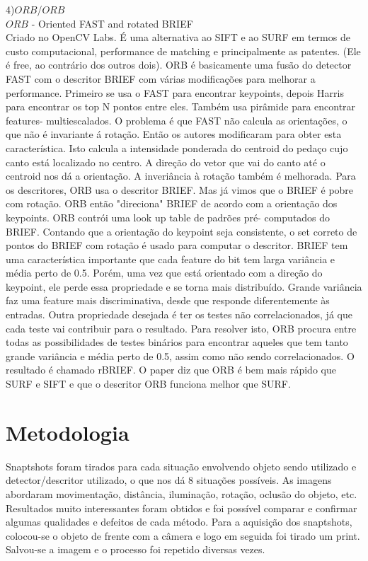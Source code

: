 \documentclass[conference]{IEEEtran}
\begin{document}
	  4)$ORB$/$ORB$					\\
	 $ORB$ - Oriented FAST and rotated BRIEF	\\
	 Criado no OpenCV Labs. \'E uma alternativa ao SIFT e ao SURF em termos de custo computacional, performance 
	 de matching e principalmente as patentes. (Ele \'e free, ao contr\'ario dos outros dois).
	 ORB \'e basicamente uma fus\~ao do detector FAST com o descritor BRIEF com v\'arias modifica\c{c}\~oes para melhorar 
	 a performance. 
	 Primeiro se usa o FAST para encontrar keypoints, depois Harris para encontrar os top N pontos entre eles. Tamb\'em 
	 usa pir\^amide para encontrar features- multiescalados. O problema \'e que FAST n\~ao calcula as orienta\c{c}\~oes, 
	 o que n\~ao \'e invariante \'a rota\c{c}\~ao. Ent\~ao os autores modificaram para obter esta caracter\'istica.
	 Isto calcula a intensidade ponderada do centroid do peda\c{c}o cujo canto est\'a localizado no centro. A dire\c{c}\~ao 
	 do vetor que vai do canto at\'e o centroid nos d\'a a orienta\c{c}\~ao. A inveri\^ancia \`a rota\c{c}\~ao tamb\'em 
	 \'e melhorada.
	 Para os descritores, ORB usa o descritor BRIEF. Mas j\'a vimos que o BRIEF \'e pobre com rota\c{c}\~ao. ORB ent\~ao 
	 "direciona" BRIEF de acordo com a orienta\c{c}\~ao dos keypoints. ORB contr\'oi uma look up table de padr\~oes pr\'e-
	 computados do BRIEF. Contando que a orienta\c{c}\~ao do keypoint seja consistente, o set correto de pontos do BRIEF 
	 com rota\c{c}\~ao \'e usado para computar o descritor.
	 BRIEF tem uma caracter\'istica importante que cada feature do bit tem larga vari\^ancia e m\'edia perto de 0.5. Por\'em, 
	 uma vez que est\'a orientado com a dire\c{c}\~ao do keypoint, ele perde essa propriedade e se torna mais distribu\'ido. 
	 Grande vari\^ancia faz uma feature mais discriminativa, desde que responde diferentemente \`as entradas. Outra
	 propriedade desejada \'e ter os testes n\~ao correlacionados, j\'a que cada teste vai contribuir para o resultado.
	 Para resolver isto, ORB procura entre todas as possibilidades de testes bin\'arios para encontrar aqueles que tem 
	 tanto grande vari\^ancia e m\'edia perto de 0.5, assim como n\~ao sendo correlacionados. O resultado \'e chamado 
	 rBRIEF.
	 O paper diz que ORB \'e bem mais r\'apido que SURF e SIFT e que o descritor ORB funciona melhor que SURF.
	 
\section{Metodologia} 
\label{sec:meth} 
  \nobreak\hspace{.16667em plus .08333em} 
  Snaptshots foram tirados para cada situa\c{c}\~ao envolvendo objeto sendo utilizado e detector/descritor
  utilizado, o que nos d\'a 8 situa\c{c}\~oes poss\'iveis. As imagens abordaram movimenta\c{c}\~ao, dist\^ancia, ilumina\c{c}\~ao,  
  rota\c{c}\~ao, oclus\~ao do objeto, etc. Resultados muito interessantes foram 
  obtidos e foi poss\'ivel comparar e confirmar algumas qualidades e defeitos de cada m\'etodo. 
  Para a aquisi\c{c}\~ao dos snaptshots, colocou-se o objeto de frente com a c\^amera e logo em seguida foi tirado um print.
  Salvou-se a imagem e o processo foi repetido diversas vezes.
  
\end{document}
